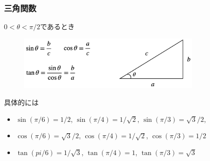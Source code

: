 \documentclass[dvipdfmx,cjk,10.2pt]{beamer}
\theoremstyle{definition}
\begin{document}
\begin{frame}
\frametitle{三角関数}

$0 <\theta <\pi/2$であるとき

\begin{figure}[htbp]
 \begin{center} 
  \includegraphics[width=90mm]{sin_cos_tan.png}
 \end{center}
\end{figure}

具体的には
\begin{itemize}
\item $\sin(\pi/6)=1/2$, $\sin(\pi/4)=1/\sqrt{2}$, $\sin(\pi/3) =\sqrt{3}/2$, 
\item $\cos(\pi/6)=\sqrt{3}/2$, $\cos(\pi/4)=1/\sqrt{2}$, $\cos(\pi/3)=1/2$
\item  $\tan(pi/6)=1/\sqrt{3}$, $\tan(\pi/4)=1$, $\tan(\pi/3)=\sqrt{3}$
\end{itemize}


\end{frame}



\end{document}
